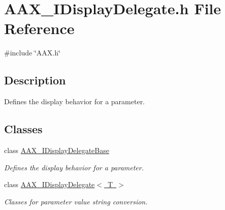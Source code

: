 \hypertarget{a00581}{}\section{A\+A\+X\+\_\+\+I\+Display\+Delegate.\+h File Reference}
\label{a00581}
{\ttfamily \#include \char`\"{}A\+A\+X.\+h\char`\"{}}\newline


\subsection{Description}
Defines the display behavior for a parameter. 

\subsection*{Classes}
\begin{DoxyCompactItemize}
\item 
class \mbox{\hyperlink{a01797}{A\+A\+X\+\_\+\+I\+Display\+Delegate\+Base}}
\begin{DoxyCompactList}\small\item\em Defines the display behavior for a parameter. \end{DoxyCompactList}\item 
class \mbox{\hyperlink{a01801}{A\+A\+X\+\_\+\+I\+Display\+Delegate$<$ T $>$}}
\begin{DoxyCompactList}\small\item\em Classes for parameter value string conversion. \end{DoxyCompactList}\end{DoxyCompactItemize}
